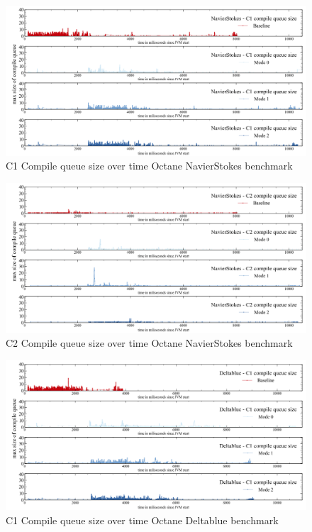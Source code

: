 \begin{figure}[ht]
  \begin{center}
    \centering
    \includegraphics[width=1.0\textwidth]{figures/octane_queue_navierstokes_separate_c1.png}
    \caption{C1 Compile queue size over time Octane NavierStokes benchmark}
    \label{f:octane_queue_navierstokes_separate_c1}
  \end{center}
\end{figure}
\begin{figure}[ht]
  \begin{center}
    \centering
    \includegraphics[width=1.0\textwidth]{figures/octane_queue_navierstokes_separate_c2.png}
    \caption{C2 Compile queue size over time Octane NavierStokes benchmark}
    \label{f:octane_queue_navierstokes_separate_c2}
  \end{center}
\end{figure}
\begin{figure}[ht]
  \begin{center}
    \centering
    \includegraphics[width=1.0\textwidth]{figures/octane_queue_deltablue_separate_c1.png}
    \caption{C1 Compile queue size over time Octane Deltablue benchmark}
    \label{f:octane_queue_deltablue_separate_c1}
  \end{center}
\end{figure}
